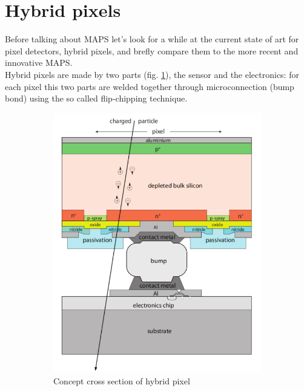 \section{Hybrid pixels}
   Before talking about MAPS let's look for a while at the current state of art for pixel detectors, hybrid pixels, and brefly compare them to the more recent and innovative MAPS. \\
   Hybrid pixels are made by two parts (fig. \ref{fig:hybrid_scheme}), the sensor and the electronics: for each pixel this two parts are welded together through microconnection (bump bond) using the so called flip-chipping technique.\\
   \begin{figure}
      \begin{subfigure}{.5\textwidth}
      \centering
      \includegraphics[width=.6\linewidth]{figures/Pixel_detectors/hybrid_scheme.png}
      \caption{Concept cross section of hybrid pixel}
      \label{fig:hybrid_scheme}
      \end{subfigure}%
      \begin{subfigure}{.5\textwidth}
      \centering

\end{subfigure}
\end{figure}
